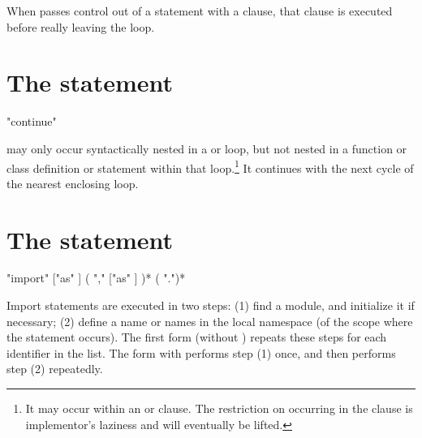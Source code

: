 When  passes control out of a  statement
with a  clause, that  clause is executed
before really leaving the loop.


\section{The  statement \label{continue}}

\begin{productionlist}
             {"continue"}
\end{productionlist}

 may only occur syntactically nested in a  or
 loop, but not nested in a function or class definition or
 statement within that loop.\footnote{It may
occur within an  or  clause.  The
restriction on occurring in the  clause is implementor's
laziness and will eventually be lifted.}
It continues with the next cycle of the nearest enclosing loop.


\section{The  statement \label{import}}

\begin{productionlist}
             {"import"  ["as" ]
                ( ","  ["as" ] )*}
             {( ".")* }
\end{productionlist}

Import statements are executed in two steps: (1) find a module, and
initialize it if necessary; (2) define a name or names in the local
namespace (of the scope where the  statement occurs).
The first form (without ) repeats these steps for each
identifier in the list.  The form with  performs step
(1) once, and then performs step (2) repeatedly.

